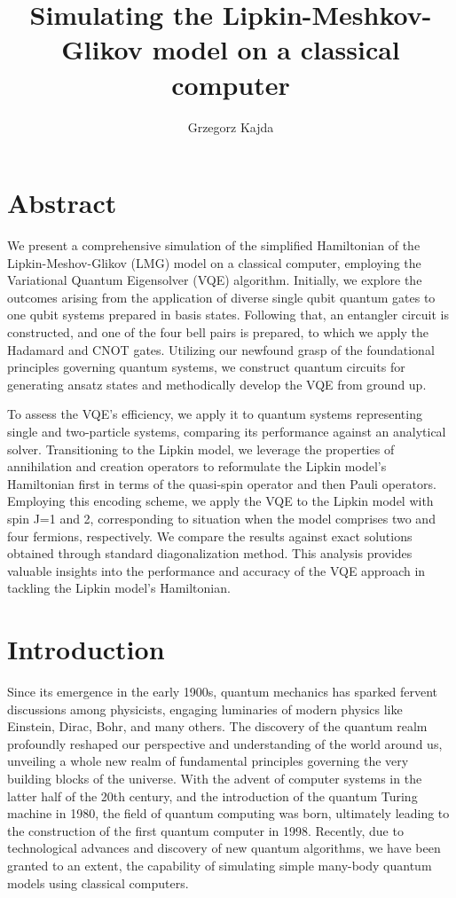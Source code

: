 \documentclass[onecolumn,10pt,cleanfoot]{asme2ej}
\author{Grzegorz Kajda
    \affiliation{
	Bachelor Student, Robotics and Intelligent Systems\\ \\[-10pt]
	Department of Informatics The faculty of Mathematics and Natural Sciences\\ \\[-10pt]
    Email: grzegork@ifi.uio.no
    }
}
\begin{document}
\title{Simulating the Lipkin-Meshkov-Glikov model on a classical computer}

\maketitle

\section{Abstract}

We present a comprehensive simulation of the simplified Hamiltonian of the Lipkin-Meshov-Glikov (LMG) model on a classical computer, employing the Variational Quantum Eigensolver (VQE) algorithm. Initially, we explore the outcomes arising from the application of diverse single qubit quantum gates to one qubit systems prepared in basis states. Following that, an entangler circuit is constructed, and one of the four bell pairs is prepared, to which we apply the Hadamard and CNOT gates. Utilizing our newfound grasp of the foundational principles governing quantum systems, we construct quantum circuits for generating ansatz states and methodically develop the VQE from ground up.

To assess the VQE's efficiency, we apply it to quantum systems representing single and two-particle systems, comparing its performance against an analytical solver. Transitioning to the Lipkin model, we leverage the properties of annihilation and creation operators to reformulate the Lipkin model's Hamiltonian first in terms of the quasi-spin operator and then Pauli operators. Employing this encoding scheme, we apply the VQE to the Lipkin model with spin J=1 and 2, corresponding to situation when the model comprises two and four fermions, respectively. We compare the results against exact solutions obtained through standard diagonalization method. This analysis provides valuable insights into the performance and accuracy of the VQE approach in tackling the Lipkin model's Hamiltonian.
	

\section{Introduction}
Since its emergence in the early 1900s, quantum mechanics has sparked fervent discussions among physicists, engaging luminaries of modern physics like Einstein, Dirac, Bohr, and many others. The discovery of the quantum realm profoundly reshaped our perspective and understanding of the world around us, unveiling a whole new realm of fundamental principles governing the very building blocks of the universe. With the advent of computer systems in the latter half of the 20th century, and the introduction of the quantum Turing machine in 1980, the field of quantum computing was born, ultimately leading to the construction of the first quantum computer in 1998. Recently, due to technological advances and discovery of new quantum algorithms, we have been granted to an extent, the capability of simulating simple many-body quantum models using classical computers.
\end{document}
